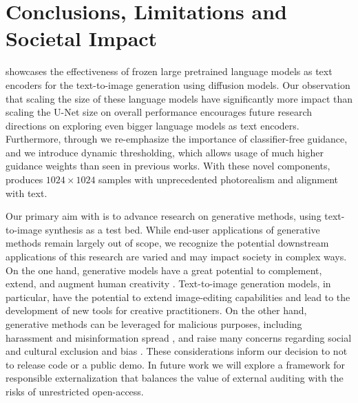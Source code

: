 \vspace{\presectionspace}
\section{Conclusions, Limitations and Societal Impact}
\label{sec:limitations}
\vspace{\postsectionspace}

\name showcases the effectiveness of frozen large pretrained language models as text encoders for the text-to-image generation using diffusion models. Our observation that scaling the size of these language models have significantly more impact than scaling the U-Net size on overall performance encourages future research directions on exploring even bigger language models as text encoders. Furthermore, through \name we re-emphasize the importance of classifier-free guidance, and we introduce dynamic thresholding, which allows usage of much higher guidance weights than seen in previous works. With these novel components, \name produces $1024\times1024$ samples with unprecedented photorealism and alignment with text.

Our primary aim with \name is to advance research on generative methods, using text-to-image synthesis as a test bed. While end-user applications of generative methods remain largely out of scope, we recognize the potential downstream applications of this research are varied and may impact society in complex ways. On the one hand, generative models have a great potential to complement, extend, and augment human creativity \cite{hughes2021}. Text-to-image generation models, in particular, have the potential to extend image-editing capabilities  and lead to the development of new tools for creative practitioners. On the other hand, generative methods can be leveraged for malicious purposes, including harassment and misinformation spread \cite{franks2019}, and raise many concerns regarding social and cultural exclusion and bias \cite{Srinivasan2021, Sequeira2021, Steed2021}. 
These considerations inform our decision to not to release code or a public demo. In future work we will explore a framework for responsible externalization that balances the value of external auditing with the risks of unrestricted open-access.

